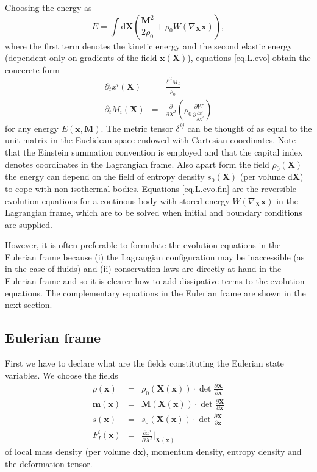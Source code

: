 \documentclass[
10pt, %
a4paper, %
oneside, %
headinclude,footinclude, %
BCOR5mm, %
]{scrartcl}
\newcommand{\xx}{\mathbf{x}}
\newcommand{\XX}{\mathbf{X}}
\newcommand{\dX}{\mathrm{d}\XX}
\newcommand{\dx}{\mathrm{d}\xx}
\newcommand{\mm}{\mathbf{m}}
\newcommand{\MM}{\mathbf{M}}
\begin{document}
Choosing the energy as
\begin{equation}
	E = \int\dX \left(\frac{\MM^2}{2\rho_0} + \rho_0 W(\nabla_\XX \xx)\right),
\end{equation}
where the first term denotes the kinetic energy and the second elastic energy (dependent only on gradients of the field $\xx(\XX)$), equations \eqref{eq.L.evo} obtain the concerete form
\begin{subequations}\label{eq.L.evo.fin}
	\begin{eqnarray}
		\partial_t x^i(\XX) &=& \frac{\delta^{ij} M_j}{\rho_0}\\
		\partial_t M_i(\XX) &=& \frac{\partial}{\partial X^I}\left(\rho_0 \frac{\partial W}{\partial \frac{\partial x^i}{\partial X^I}}\right)
	\end{eqnarray}
\end{subequations}
	for any energy $E(\xx,\MM)$. The metric tensor $\delta^{ij}$ can be thought of as equal to the 
	unit matrix in the Euclidean space endowed with Cartesian coordinates. Note that the Einstein 
	summation convention is employed and that the capital index denotes coordinates in the 
	Lagrangian frame. Also apart form the field $\rho_0(\XX)$ the energy can depend on the field of 
	entropy density $s_0(\XX)$ (per volume $\dX$) to cope with non-isothermal bodies. Equations 
	\eqref{eq.L.evo.fin} are the reversible evolution equations for a continous body with stored 
	energy $W(\nabla_\XX \xx)$ in the Lagrangian frame, which are to be solved when initial and 
	boundary conditions are supplied. 



However, it is often preferable to formulate the evolution equations in the Eulerian frame because (i) the Lagrangian configuration may be inaccessible (as in the case of fluids) and (ii) conservation laws are directly at hand in the Eulerian frame and so it is clearer how to add dissipative terms to the evolution equations. The complementary equations in the Eulerian frame are shown in the next section.

\subsection{Eulerian frame}
First we have to declare what are the fields constituting the Eulerian state variables. We choose the fields
\begin{subequations}\label{eq.x.E}
	\begin{eqnarray}
		\rho(\xx) &=& \rho_0(\XX(\xx)) \cdot \det \frac{\partial \XX}{\partial \xx}\\
		\mm(\xx) &=& \MM(\XX(\xx)) \cdot \det \frac{\partial \XX}{\partial \xx}\\
		s(\xx) &=& s_0(\XX(\xx)) \cdot \det \frac{\partial \XX}{\partial \xx}\\
		F^i_I(\xx) &=& \frac{\partial x^i}{\partial X^I}\Big|_{\XX(\xx)}
	\end{eqnarray}
\end{subequations}
of local mass density (per volume $\dx$), momentum density, entropy density and the deformation tensor. 
\end{document}
